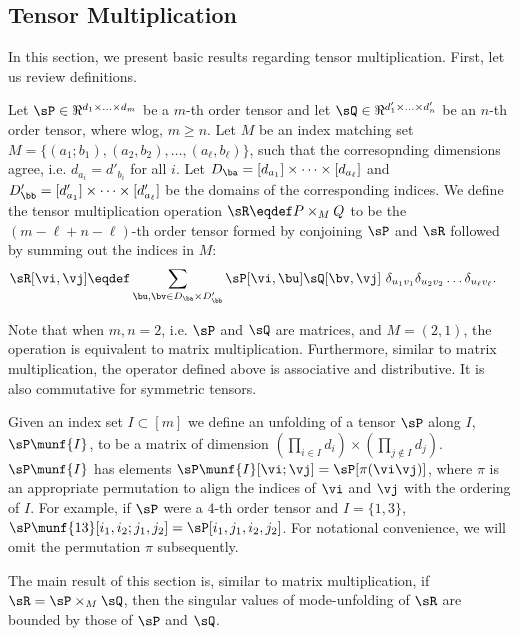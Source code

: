 \subsection{Tensor Multiplication}
\label{app:tensor-multiplication}

In this section, we present basic results regarding tensor
multiplication. First, let us review definitions.

Let $\sP \in \Re^{d_1 \times \ldots \times d_m}$ be a $m$-th order tensor and let $\sQ \in \Re^{d'_1 \times \ldots \times d'_n}$ be an $n$-th order tensor, where wlog, $m \ge n$. 
Let $M$ be an index matching set $M = \{ (a_1; b_1),
  (a_2, b_2), \ldots, (a_\ell, b_\ell) \}$, such that the corresopnding
  dimensions agree, i.e. $d_{a_i} = d'_{b_i}$ for all $i$. Let $D_{\ba}
  = [d_{a_1}] \times \cdots \times [d_{a_\ell}]$ and $D'_{\bb}
  = [d'_{a_1}] \times \cdots \times [d'_{a_\ell}]$ be the domains of the
  corresponding indices.
We define the tensor multiplication operation $\sR \eqdef P \times_{M}
  Q$ to be the $(m - \ell + n - \ell)$-th order tensor formed by
  conjoining $\sP$ and $\sR$ followed by summing out the indices in $M$:
\begin{align*}
  \sR[\vi,\vj] &\eqdef \sum_{\bu, \bv \in D_\ba \times D'_\bb} \sP[\vi,\bu] \sQ[\bv ,\vj] ~ \delta_{u_1 v_1} \delta_{u_2 v_2} \ldots \delta_{u_\ell v_\ell}.
\end{align*}

Note that when $m, n = 2$, i.e. $\sP$ and $\sQ$ are matrices, and $M
  = {(2,1)}$, the operation is equivalent to matrix multiplication. 
Furthermore, similar to matrix multiplication, the operator defined above
  is associative and distributive. 
It is also commutative for symmetric tensors.

Given an index set $I \subset [m]$ we
  define an unfolding of a tensor $\sP$ along $I$,
 $\sP\munf{I}$, to be a matrix of dimension $(\prod_{i \in I} d_i)
 \times (\prod_{j \not\in I} d_j)$. $\sP\munf{I}$ has elements
 $\sP\munf{I}[\vi;\vj] = \sP[\pi(\vi\vj)]$, where $\pi$ is an
 appropriate permutation to align the indices of $\vi$ and $\vj$ with
 the ordering of $I$. 
For example, if $\sP$ were a $4$-th order tensor and $I = \{1,3\}$,
  $\sP\munf{13}[i_1,i_2; j_1,j_2] = \sP[i_1,j_1,i_2,j_2]$.
For notational convenience, we will omit the permutation $\pi$ subsequently.


The main result of this section is, similar to matrix multiplication, if
$\sR = \sP \times_{M} \sQ$, then the singular values of mode-unfolding
of $\sR$ are bounded by those of $\sP$ and $\sQ$.

